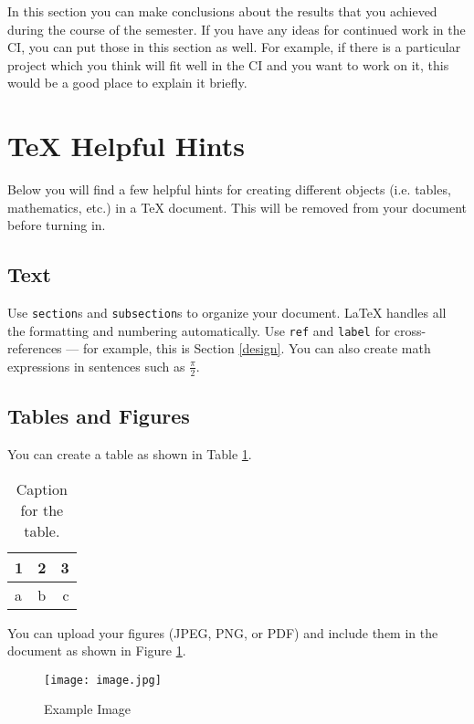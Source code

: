 \documentclass[paper=a4, fontsize=11pt,twoside]{scrartcl}
\begin{document}
In this section you can make conclusions about the results that you achieved during the course of the semester.  If you have any ideas for continued work in the CI, you can put those in this section as well.  For example, if there is a particular project which you think will fit well in the CI and you want to work on it, this would be a good place to explain it briefly.

\section*{TeX Helpful Hints}\label{design}

Below you will find a few helpful hints for creating different objects (i.e. tables, mathematics, etc.) in a TeX document.  This will be removed from your document before turning in.

\subsection*{Text}

Use \texttt{section}s and \texttt{subsection}s to organize your document. \LaTeX{} handles all the formatting and numbering automatically. Use \texttt{ref} and \texttt{label} for cross-references --- for example, this is Section \ref{design}. You can also create math expressions in sentences such as $\frac{\pi}{2}$.

\subsection*{Tables and Figures}

You can create a table as shown in Table \ref{tab:table1}.

\begin{table}
	\centering
	\caption{Caption for the table.}
	\label{tab:table1}
	\begin{tabular}{l|c||r}
		\hline
		1 & 2 & 3\\
		\hline
		a & b & c\\
		\hline
	\end{tabular}
\end{table}

You can upload your figures (JPEG, PNG, or PDF) and include them in the document as shown in Figure \ref{fig:your-figure}.

\begin{figure}[h!]
\texttt{[image: image.jpg]}
\caption{\label{fig:your-figure}Example Image}
\end{figure}
\end{document}
